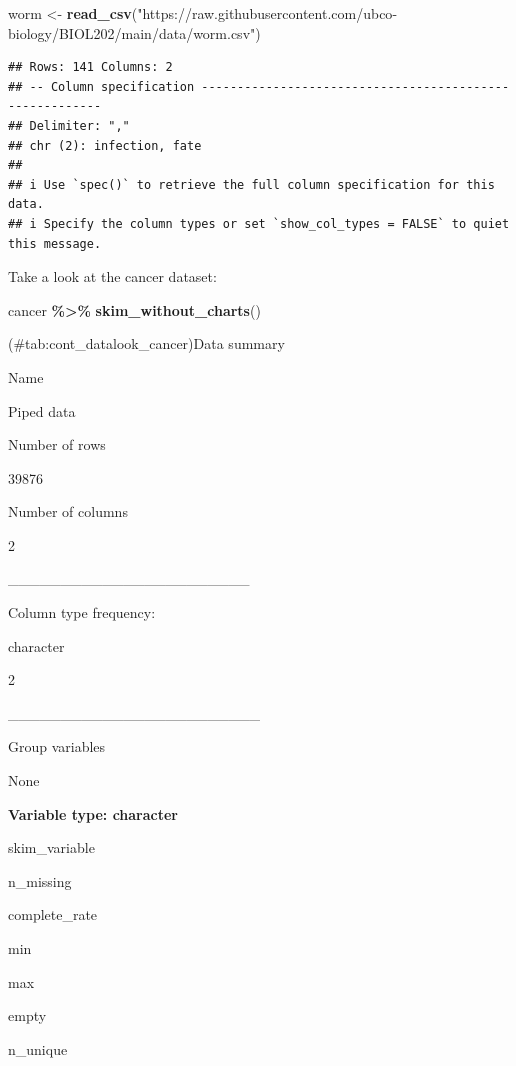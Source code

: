 \documentclass[
]{book}
\newenvironment{Shaded}{\begin{snugshade}}{\end{snugshade}}
\newcommand{\FunctionTok}[1]{\textcolor[rgb]{0.13,0.29,0.53}{\textbf{#1}}}
\newcommand{\NormalTok}[1]{#1}
\newcommand{\OtherTok}[1]{\textcolor[rgb]{0.56,0.35,0.01}{#1}}
\newcommand{\SpecialCharTok}[1]{\textcolor[rgb]{0.81,0.36,0.00}{\textbf{#1}}}
\newcommand{\StringTok}[1]{\textcolor[rgb]{0.31,0.60,0.02}{#1}}
\begin{document}
\begin{Shaded}
\begin{Highlighting}[]
\NormalTok{worm }\OtherTok{\textless{}{-}} \FunctionTok{read\_csv}\NormalTok{(}\StringTok{"https://raw.githubusercontent.com/ubco{-}biology/BIOL202/main/data/worm.csv"}\NormalTok{)}
\end{Highlighting}
\end{Shaded}

\begin{verbatim}
## Rows: 141 Columns: 2
## -- Column specification --------------------------------------------------------
## Delimiter: ","
## chr (2): infection, fate
## 
## i Use `spec()` to retrieve the full column specification for this data.
## i Specify the column types or set `show_col_types = FALSE` to quiet this message.
\end{verbatim}

Take a look at the cancer dataset:

\begin{Shaded}
\begin{Highlighting}[]
\NormalTok{cancer }\SpecialCharTok{\%\textgreater{}\%}
 \FunctionTok{skim\_without\_charts}\NormalTok{()}
\end{Highlighting}
\end{Shaded}

(\#tab:cont\_datalook\_cancer)Data summary

Name

Piped data

Number of rows

39876

Number of columns

2

\_\_\_\_\_\_\_\_\_\_\_\_\_\_\_\_\_\_\_\_\_\_\_

Column type frequency:

character

2

\_\_\_\_\_\_\_\_\_\_\_\_\_\_\_\_\_\_\_\_\_\_\_\_

Group variables

None

\textbf{Variable type: character}

skim\_variable

n\_missing

complete\_rate

min

max

empty

n\_unique
\end{document}
